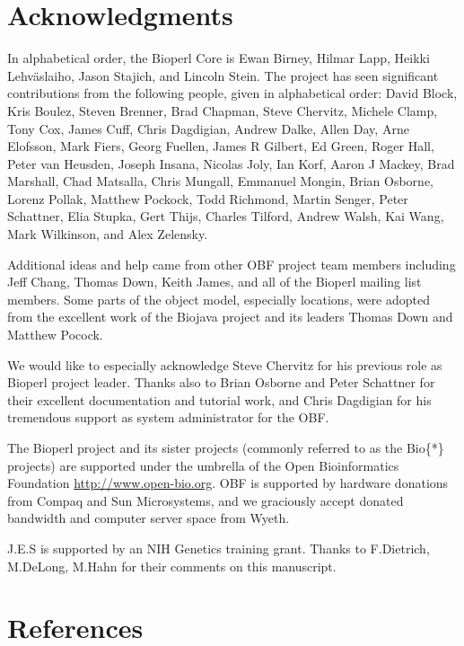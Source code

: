\documentclass[12pt]{article}
\begin{document}
\section{Acknowledgments}

In alphabetical order, the Bioperl Core is Ewan Birney, Hilmar Lapp,
Heikki Lehv\"{a}slaiho, Jason Stajich, and Lincoln Stein.  The project
has seen significant contributions from the following people, given in
alphabetical order: David Block, Kris Boulez, Steven Brenner, Brad
Chapman, Steve Chervitz, Michele Clamp, Tony Cox, James Cuff, Chris
Dagdigian, Andrew Dalke, Allen Day, Arne Elofsson, Mark Fiers, Georg
Fuellen, James R Gilbert, Ed Green, Roger Hall, Peter van Heusden,
Joseph Insana, Nicolas Joly, Ian Korf, Aaron J Mackey, Brad Marshall,
Chad Matsalla, Chris Mungall, Emmanuel Mongin, Brian Osborne, Lorenz
Pollak, Matthew Pockock, Todd Richmond, Martin Senger, Peter
Schattner, Elia Stupka, Gert Thijs, Charles Tilford, Andrew Walsh, Kai
Wang, Mark Wilkinson, and Alex Zelensky.

Additional ideas and help came from other OBF project team members
including Jeff Chang, Thomas Down, Keith James, and all of the Bioperl
mailing list members.  Some parts of the object model, especially
locations, were adopted from the excellent work of the Biojava project
and its leaders Thomas Down and Matthew Pocock.

We would like to especially acknowledge Steve Chervitz for his
previous role as Bioperl project leader.  Thanks also to Brian Osborne
and Peter Schattner for their excellent documentation and tutorial
work, and Chris Dagdigian for his tremendous support as system
administrator for the OBF.

The Bioperl project and its sister projects (commonly referred to as
the Bio\{*\} projects) are supported under the umbrella of the Open
Bioinformatics Foundation \url{http://www.open-bio.org}.
OBF is supported by hardware donations from Compaq and Sun
Microsystems, and we graciously accept donated bandwidth and computer
server space from Wyeth.

J.E.S is supported by an NIH Genetics training grant.  Thanks to
F.Dietrich, M.DeLong, M.Hahn for their comments on this manuscript.

\section{References}


 
\end{document}
